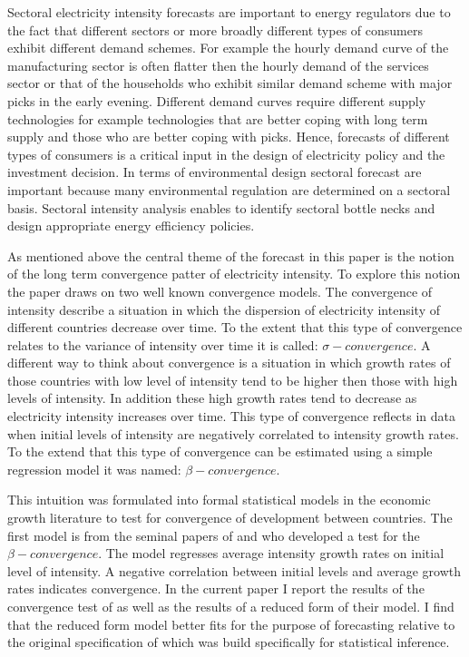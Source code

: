 \documentclass[]{amsart}
\begin{document}
\bigskip

Sectoral electricity intensity forecasts are important to energy regulators due to the fact that different sectors or more broadly different types of consumers exhibit different demand schemes. For example the hourly demand curve of the manufacturing sector is often flatter then the hourly demand of the services sector or that of the households who exhibit similar demand scheme with major picks in the early evening. Different demand curves require different supply technologies for example technologies that are better coping with long term supply and those who are better coping with picks. Hence, forecasts of different types of consumers is a critical input in the design of electricity policy and the investment decision. In terms of environmental design sectoral forecast are important because many environmental regulation are determined on a sectoral basis. Sectoral intensity analysis enables to identify sectoral bottle necks and design appropriate energy efficiency policies. 

\bigskip

As mentioned above the central theme of the forecast in this paper is the notion of the long term convergence patter of electricity intensity. To explore this notion the paper draws on two well known convergence models. The convergence of intensity describe a situation in which the dispersion of electricity intensity of different countries decrease over time. To the extent that this type of convergence relates to the variance of intensity over time it is called: $\sigma-convergence$. A different way to think about convergence is a situation in which growth rates of those countries with low level of intensity tend to be higher then those with high levels of intensity. In addition these high growth rates tend to decrease as electricity intensity increases over time. This type of convergence reflects in data when initial levels of intensity are negatively correlated to intensity growth rates. To the extend that this type of convergence can be estimated using a simple regression model it was named: $\beta-convergence$. 

\bigskip

This intuition was formulated into formal statistical models in the economic growth literature to test for convergence of development between countries. The first model is from the seminal papers of \cite{barro1992convergence} and \cite{sala1996classical} who developed a test for the $\beta-convergence$. The model regresses average intensity growth rates on initial level of intensity. A negative correlation between initial levels and average growth rates indicates convergence. In the current paper I report the results of the convergence test of \cite{barro1992convergence} as well as the results of a reduced form of their model. I find that the reduced form model better fits for the purpose of forecasting relative to the original specification of \cite{barro1992convergence} which was build specifically for statistical inference.
\end{document}
